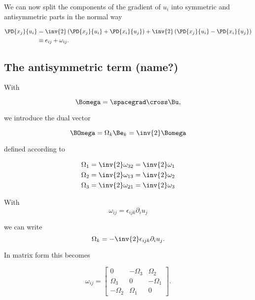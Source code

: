 We can now split the components of the gradient of $u_i$ into symmetric and antisymmetric parts in the normal way

\begin{equation}\label{eqn:continuumL9:50}
\begin{aligned}
\PD{x_j}{u_i}
&= 
\inv{2} \left( 
\PD{x_j}{u_i}
+\PD{x_i}{u_j}
\right)
+
\inv{2} \left( 
\PD{x_j}{u_i}
-\PD{x_i}{u_j}
\right) \\
&\equiv e_{ij} + \omega_{ij}.
\end{aligned}
\end{equation}

\subsection{The antisymmetric term (name?)}

With

\begin{equation}\label{eqn:continuumL9:70}
\Bomega = \spacegrad \cross \Bu,
\end{equation}

we introduce the dual vector 

\begin{equation}\label{eqn:continuumL9:90}
\BOmega = \Omega_k \Be_k = \inv{2} \Bomega
\end{equation}

defined according to

\begin{align}\label{eqn:continuumL9:110}
\Omega_1 &= \inv{2} \omega_{32} = \inv{2} \omega_1 \\
\Omega_2 &= \inv{2} \omega_{13} = \inv{2} \omega_2 \\
\Omega_3 &= \inv{2} \omega_{21} = \inv{2} \omega_3 
\end{align}

With 
\begin{equation}\label{eqn:continuumL9:n}
\omega_{ij}
= \epsilon_{ijk} \partial_i u_j
\end{equation}

we can write
\begin{equation}\label{eqn:continuumL9:590}
\Omega_k = -\inv{2} \epsilon_{ijk} \partial_i u_j.
\end{equation}

In matrix form this becomes

\begin{equation}\label{eqn:continuumL9:130}
\omega_{ij} = 
\begin{bmatrix}
0 & -\Omega_3 & \Omega_2 \\
\Omega_3 & 0 & -\Omega_1  \\
-\Omega_2 & \Omega_1 & 0
\end{bmatrix}.
\end{equation}

